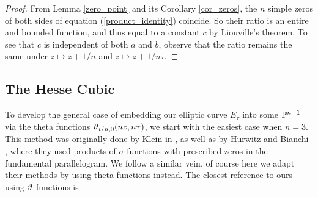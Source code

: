 \begin{proof}
	From Lemma \ref{zero_point} and its Corollary \ref{cor_zeros}, the $n$ simple zeros of both sides of equation (\ref{product_identity}) coincide. So their ratio is an entire and bounded function, and thus equal to a constant $c$ by Liouville's theorem. To see that $c$ is independent of both $a$ and $b$, observe that the ratio remains the same under $z \mapsto z + 1/n$ and $z \mapsto z + 1/n\tau$.
\end{proof}

\subsection{The Hesse Cubic}

To develop the general case of embedding our elliptic curve $E_{\tau}$ into some $\mathbb{P}^{n-1}$ via the theta functions $\vartheta_{i/n,0}(nz,n\tau)$, we start with the easiest case when $n =3$. This method was originally done by Klein in \cite{KF_1892}, as well as by Hurwitz \cite{Hurtwiz_1886} and Bianchi \cite{Bianchi_1880}, where they used products of $\sigma$-functions with prescribed zeros in the fundamental parallelogram. We follow a similar vein, of course here we adapt their methods by using theta functions instead. The closest reference to ours using $\vartheta$-functions is \cite{Tracy_1985}.

